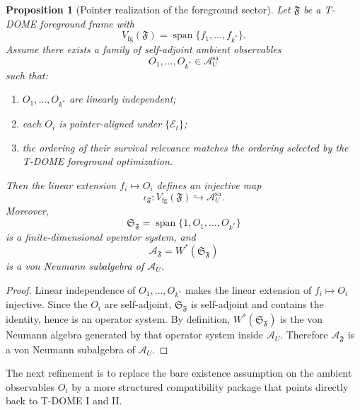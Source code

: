\documentclass[12pt]{article}
\newtheorem{proposition}[theorem]{Proposition}
\theoremstyle{definition}
\theoremstyle{remark}
\begin{document}
\begin{proposition}[Pointer realization of the foreground sector]\label{prop:pointer}
Let \(\mathfrak F\) be a T-DOME foreground frame with
\[
V_{\mathrm{fg}}(\mathfrak F)
=
\operatorname{span}\{f_1,\dots,f_{k^*}\}.
\]
Assume there exists a family of self-adjoint ambient observables
\[
O_1,\dots,O_{k^*}\in\mathcal A_U^{\mathrm{sa}}
\]
such that:
\begin{enumerate}
\item \(O_1,\dots,O_{k^*}\) are linearly independent;
\item each \(O_i\) is pointer-aligned under \(\{\mathcal E_t\}\);
\item the ordering of their survival relevance matches the ordering
  selected by the T-DOME foreground optimization.
\end{enumerate}
Then the linear extension \(f_i\mapsto O_i\) defines an injective map
\[
\iota_{\mathfrak F}:V_{\mathrm{fg}}(\mathfrak F)\hookrightarrow
\mathcal A_U^{\mathrm{sa}}.
\]
Moreover,
\[
\mathfrak S_{\mathfrak F}
=
\operatorname{span}\{1,O_1,\dots,O_{k^*}\}
\]
is a finite-dimensional operator system, and
\[
\mathcal A_{\mathfrak F}
=
W^*(\mathfrak S_{\mathfrak F})
\]
is a von Neumann subalgebra of \(\mathcal A_U\).
\end{proposition}

\begin{proof}
Linear independence of \(O_1,\dots,O_{k^*}\) makes the linear extension
of \(f_i\mapsto O_i\) injective. Since the \(O_i\) are self-adjoint,
\(\mathfrak S_{\mathfrak F}\) is self-adjoint and contains the
identity, hence is an operator system. By definition,
\(W^*(\mathfrak S_{\mathfrak F})\) is the von Neumann algebra generated
by that operator system inside \(\mathcal A_U\). Therefore
\(\mathcal A_{\mathfrak F}\) is a von Neumann subalgebra of
\(\mathcal A_U\).
\end{proof}

The next refinement is to replace the bare existence assumption on the
ambient observables \(O_i\) by a more structured compatibility package
that points directly back to T-DOME I and II.
\end{document}
